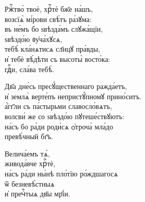 \documentclass{article}
\begin{document}
%
%
Ржⷭ҇тво̀ твоѐ, хрⷭ҇тѐ бж҃е на́шъ,\\
возсїѧ̀ мі́рови свѣ́тъ ра́зꙋма:\\
въ не́мъ бо ѕвѣзда́мъ слꙋжа́щїи,\\
ѕвѣздо́ю ᲂу҆ча́хꙋсѧ,\\
тебѣ̀ кла́нѧтисѧ сл҃нцꙋ пра́вды,\\
и҆ тебѐ вѣ́дѣти съ высоты̀ восто́ка:\\
гдⷭ҇и, сла́ва тебѣ̀. 

%
Дв҃а дне́сь пресꙋ́щественнаго ражда́етъ,\\
и҆ землѧ̀ верте́пъ непристꙋ́пномꙋ прино́ситъ.\\
а҆́гг҃ли съ па́стырьми славосло́вѧтъ,\\
волсви́ же со ѕвѣздо́ю пꙋтеше́ствꙋютъ:\\
на́съ бо ра́ди роди́сѧ ѻ҆троча̀ мла́до\\
превѣ́чный бг҃ъ. 

%
Велича́емъ тѧ̀, \\
живода́вче хрⷭ҇тѐ, \\
на́съ ра́ди ны́нѣ пло́тїю ро́ждшагосѧ\\
ѿ безневѣ́стныѧ\\
и҆ пречⷭ҇тыѧ дв҃ы мр҃і́и. 
\end{document}
